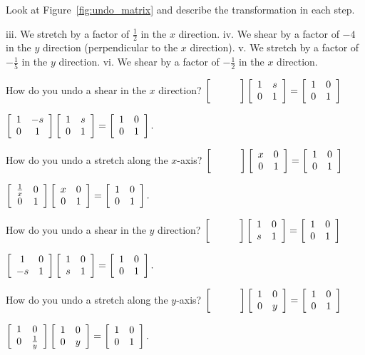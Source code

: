 \documentclass[../key.tex]{subfiles}
\begin{document}
\begin{outer_problem}
\item Look at Figure~\ref{fig:undo_matrix} and describe the transformation in each step.
\end{outer_problem}

iii. We stretch by a factor of $\frac{1}{2}$ in the $x$ direction.
iv. We shear by a factor of $-4$ in the $y$ direction (perpendicular to the $x$ direction).
v. We stretch by a factor of $-\frac{1}{5}$ in the $y$ direction.
vi. We shear by a factor of $-\frac{1}{2}$ in the $x$ direction.

\begin{outer_problem}
\item
\end{outer_problem}

\begin{inner_problem}[start=1]
\item How do you undo a shear in the $x$ direction?
$\blanktwomat\twomat{1}{s}{0}{1}=\twomat{1}{0}{0}{1}$
\end{inner_problem}

$\left[\begin{array}{cc} 1 & -s \\ 0 & 1 \end{array}\right]\left[\begin{array}{cc} 1 & s \\ 0 & 1 \end{array}\right]=\left[\begin{array}{cc} 1 & 0 \\ 0 & 1 \end{array}\right].$

\begin{inner_problem}
\item How do you undo a stretch along the $x$-axis?
$\blanktwomat\twomat{x}{0}{0}{1}=\twomat{1}{0}{0}{1}$
\end{inner_problem}

$\left[\begin{array}{cc} \frac{1}{x} & 0 \\ 0 & 1 \end{array}\right]\left[\begin{array}{cc} x & 0 \\ 0 & 1 \end{array}\right]=\left[\begin{array}{cc} 1 & 0 \\ 0 & 1 \end{array}\right].$

\begin{inner_problem}
\item How do you undo a shear in the $y$ direction?
$\blanktwomat\twomat{1}{0}{s}{1}=\twomat{1}{0}{0}{1}$
\end{inner_problem}

$\left[\begin{array}{cc} 1 & 0 \\ -s & 1 \end{array}\right]\left[\begin{array}{cc} 1 & 0 \\ s & 1 \end{array}\right]=\left[\begin{array}{cc} 1 & 0 \\ 0 & 1 \end{array}\right].$

\begin{inner_problem}
\item How do you undo a stretch along the $y$-axis?
$\blanktwomat\twomat{1}{0}{0}{y}=\twomat{1}{0}{0}{1}$
\end{inner_problem}

$\left[\begin{array}{cc} 1 & 0 \\ 0 & \frac{1}{y} \end{array}\right]\left[\begin{array}{cc} 1 & 0 \\ 0 & y \end{array}\right]=\left[\begin{array}{cc} 1 & 0 \\ 0 & 1 \end{array}\right].$
\end{document}
